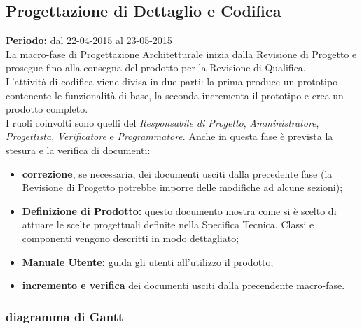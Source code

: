\newpage
\subsection{Progettazione di Dettaglio e Codifica}
\textbf{Periodo:} dal 22-04-2015 al 23-05-2015 \\
La macro-fase di Progettazione Architetturale inizia dalla Revisione di Progetto e prosegue fino alla consegna del prodotto per la Revisione di Qualifica. \\
L'attività di codifica viene divisa in due parti: la prima produce un prototipo contenente le funzionalità di base, la seconda incrementa il prototipo e crea un prodotto completo. \\
I ruoli coinvolti sono quelli del \textit{Responsabile di Progetto}, \textit{Amministratore}, \textit{Progettista}, \textit{Verificatore} e \textit{Programmatore}.
Anche in questa fase è prevista la stesura e la verifica di documenti:
\begin{itemize}
\item \textbf{correzione}, se necessaria, dei documenti usciti dalla precedente fase (la Revisione di Progetto potrebbe imporre delle modifiche ad alcune sezioni);
\item \textbf{Definizione di Prodotto:} questo documento mostra come si è scelto di attuare le scelte progettuali definite nella Specifica Tecnica. Classi e componenti vengono descritti in modo dettagliato;
\item \textbf{Manuale Utente:} guida gli utenti all'utilizzo il prodotto;
\item \textbf{incremento e verifica} dei documenti usciti dalla precendente macro-fase.
\end{itemize}

\newpage
\subsubsection{diagramma di Gantt}

